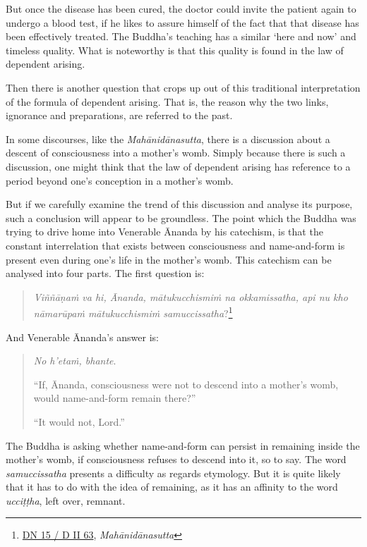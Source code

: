 But once the disease has been cured, the doctor could invite the patient again to undergo a blood test, if he likes to assure himself of the fact that that disease has been effectively treated. The Buddha's teaching has a similar `here and now' and timeless quality. What is noteworthy is that this quality is found in the law of dependent arising.

Then there is another question that crops up out of this traditional interpretation of the formula of dependent arising. That is, the reason why the two links, ignorance and preparations, are referred to the past.

In some discourses, like the \emph{Mahānidānasutta}, there is a discussion about a descent of consciousness into a mother's womb. Simply because there is such a discussion, one might think that the law of dependent arising has reference to a period beyond one's conception in a mother's womb.

But if we carefully examine the trend of this discussion and analyse its purpose, such a conclusion will appear to be groundless. The point which the Buddha was trying to drive home into Venerable Ānanda by his catechism, is that the constant interrelation that exists between consciousness and name-and-form is present even during one's life in the mother's womb. This catechism can be analysed into four parts. The first question is:

\begin{quote}
\emph{Viññāṇaṁ va hi, Ānanda, mātukucchismiṁ na okkamissatha, api nu kho nāmarūpaṁ mātukucchismiṁ samuccissatha}?\footnote{\href{https://suttacentral.net/dn15/pli/ms}{DN 15 / D II 63}, \emph{Mahānidānasutta}}
\end{quote}

And Venerable Ānanda's answer is:

\begin{quote}
\emph{No h'etaṁ, bhante}.

``If, Ānanda, consciousness were not to descend into a mother's womb, would name-and-form remain there?''

``It would not, Lord.''
\end{quote}

The Buddha is asking whether name-and-form can persist in remaining inside the mother's womb, if consciousness refuses to descend into it, so to say. The word \emph{samuccissatha} presents a difficulty as regards etymology. But it is quite likely that it has to do with the idea of remaining, as it has an affinity to the word \emph{ucciṭṭha}, left over, remnant.

